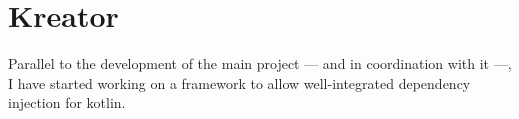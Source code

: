 






%

\chapter{Kreator}\label{sect:Kreator}

Parallel to the development of the main project --- and in coordination with it ---, I have started working on a framework to allow well-integrated dependency injection for kotlin.

